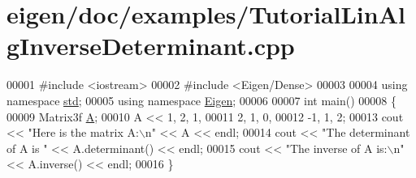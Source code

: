 \hypertarget{eigen_2doc_2examples_2_tutorial_lin_alg_inverse_determinant_8cpp_source}{}\section{eigen/doc/examples/\+Tutorial\+Lin\+Alg\+Inverse\+Determinant.cpp}
\label{eigen_2doc_2examples_2_tutorial_lin_alg_inverse_determinant_8cpp_source}

\begin{DoxyCode}
00001 \textcolor{preprocessor}{#include <iostream>}
00002 \textcolor{preprocessor}{#include <Eigen/Dense>}
00003 
00004 \textcolor{keyword}{using namespace }\hyperlink{namespacestd}{std};
00005 \textcolor{keyword}{using namespace }\hyperlink{namespace_eigen}{Eigen};
00006 
00007 \textcolor{keywordtype}{int} main()
00008 \{
00009    Matrix3f \hyperlink{group___core___module_class_eigen_1_1_matrix}{A};
00010    A << 1, 2, 1,
00011         2, 1, 0,
00012         -1, 1, 2;
00013    cout << \textcolor{stringliteral}{"Here is the matrix A:\(\backslash\)n"} << A << endl;
00014    cout << \textcolor{stringliteral}{"The determinant of A is "} << A.determinant() << endl;
00015    cout << \textcolor{stringliteral}{"The inverse of A is:\(\backslash\)n"} << A.inverse() << endl;
00016 \}
\end{DoxyCode}
